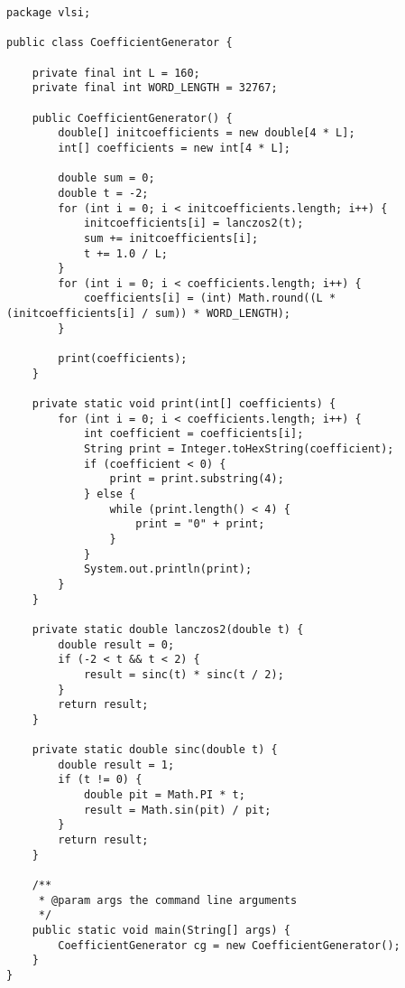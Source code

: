 \begin{verbatim}
package vlsi;

public class CoefficientGenerator {

	private final int L = 160;
	private final int WORD_LENGTH = 32767;

	public CoefficientGenerator() {
		double[] initcoefficients = new double[4 * L];
		int[] coefficients = new int[4 * L];

		double sum = 0;
		double t = -2;
		for (int i = 0; i < initcoefficients.length; i++) {
			initcoefficients[i] = lanczos2(t);
			sum += initcoefficients[i];
			t += 1.0 / L;
		}
		for (int i = 0; i < coefficients.length; i++) {
			coefficients[i] = (int) Math.round((L * (initcoefficients[i] / sum)) * WORD_LENGTH);
		}

		print(coefficients);
	}

	private static void print(int[] coefficients) {
		for (int i = 0; i < coefficients.length; i++) {
			int coefficient = coefficients[i];
			String print = Integer.toHexString(coefficient);
			if (coefficient < 0) {
				print = print.substring(4);
			} else {
				while (print.length() < 4) {
					print = "0" + print;
				}
			}
			System.out.println(print);
		}
	}

	private static double lanczos2(double t) {
		double result = 0;
		if (-2 < t && t < 2) {
			result = sinc(t) * sinc(t / 2);
		}
		return result;
	}

	private static double sinc(double t) {
		double result = 1;
		if (t != 0) {
			double pit = Math.PI * t;
			result = Math.sin(pit) / pit;
		}
		return result;
	}

	/**
	 * @param args the command line arguments
	 */
	public static void main(String[] args) {
		CoefficientGenerator cg = new CoefficientGenerator();
	}
}
\end{verbatim}

